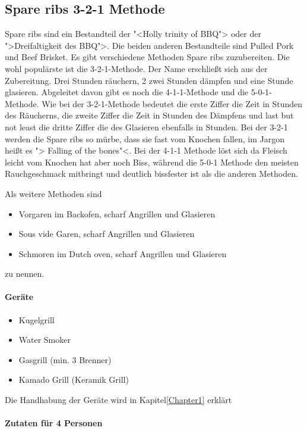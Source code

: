 \subsection{Spare ribs 3-2-1 Methode}
Spare ribs sind ein Bestandteil der "<Holly trinity of BBQ">  oder der 
">Dreifaltigkeit des BBQ">. Die beiden anderen Bestandteile sind Pulled 
Pork und Beef Brisket. 
Es gibt verschiedene Methoden Spare ribs zuzubereiten. Die wohl 
populärste ist die 3-2-1-Methode. Der Name erschließt sich aus der 
Zubereitung. Drei Stunden räuchern, 2 zwei Stunden dämpfen und eine 
Stunde glasieren. Abgeleitet davon gibt es noch die  4-1-1-Methode und 
die 5-0-1-Methode. Wie bei der 3-2-1-Methode bedeutet die erste Ziffer 
die Zeit in Stunden des Räucherns, die zweite Ziffer die Zeit in Stunden 
des Dämpfens und last but not least die dritte Ziffer die des Glasieren 
ebenfalls in Stunden.  
Bei der 3-2-1 werden die Spare ribs so mürbe, dass sie fast vom Knochen fallen, 
im Jargon heißt es "> Falling of the bones"<. Bei der 4-1-1 Methode löst 
sich da Fleisch leicht vom Knochen hat aber noch Biss, während die 5-0-1 
Methode den meisten Rauchgeschmack mitbringt und deutlich bissfester 
ist als die anderen Methoden.

Als weitere Methoden sind

\begin{itemize}[noitemsep]
	\item Vorgaren im Backofen, scharf Angrillen und Glasieren
	\item Sous vide Garen, scharf Angrillen und Glasieren
	\item Schmoren im Dutch oven, scharf Angrillen und Glasieren
\end{itemize}
zu nennen.
\newline

\paragraph{Geräte}

\begin{itemize}[noitemsep]
	\item Kugelgrill
	\item Water Smoker
 	\item Gasgrill (min. 3 Brenner)
	\item Kamado Grill (Keramik Grill)
\end{itemize}

Die Handhabung der Geräte wird in Kapitel\ref{Chapter1} erklärt

\paragraph{Zutaten für 4 Personen}

